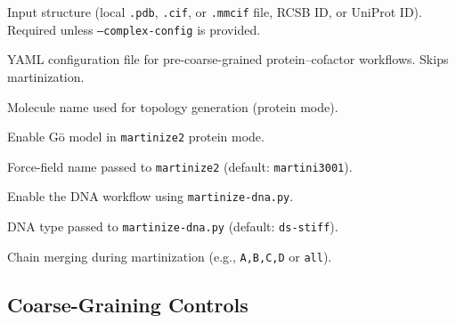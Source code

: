 \documentclass[11pt]{article}
\begin{document}
\begin{description}[leftmargin=3cm,style=nextline]

\item[\texttt{--pdb}]
Input structure (local \texttt{.pdb}, \texttt{.cif}, or \texttt{.mmcif} file,
RCSB ID, or UniProt ID).
Required unless \texttt{--complex-config} is provided.

\item[\texttt{--complex-config}]
YAML configuration file for pre-coarse-grained
protein–cofactor workflows. Skips martinization.

\item[\texttt{--moltype}]
Molecule name used for topology generation (protein mode).

\item[\texttt{--go}]
Enable G\=o model in \texttt{martinize2} protein mode.

\item[\texttt{--ff}]
Force-field name passed to \texttt{martinize2}
(default: \texttt{martini3001}).

\item[\texttt{--dna}]
Enable the DNA workflow using \texttt{martinize-dna.py}.

\item[\texttt{--dnatype}]
DNA type passed to \texttt{martinize-dna.py}
(default: \texttt{ds-stiff}).

\item[\texttt{--merge}]
Chain merging during martinization
(e.g., \texttt{A,B,C,D} or \texttt{all}).

\end{description}

\subsection{Coarse-Graining Controls}
\end{document}

